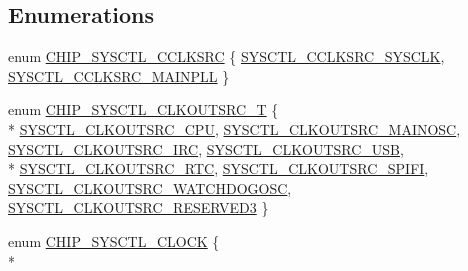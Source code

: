 \subsection*{Enumerations}
\begin{DoxyCompactItemize}
\item 
enum \hyperlink{group__CLOCK__17XX__40XX_ga1eb1eeae65911ee3e97009ae1d31d03f}{C\+H\+I\+P\+\_\+\+S\+Y\+S\+C\+T\+L\+\_\+\+C\+C\+L\+K\+S\+RC} \{ \hyperlink{group__CLOCK__17XX__40XX_gga1eb1eeae65911ee3e97009ae1d31d03faac9d326b25dd6dadba459ffdcfe0679a}{S\+Y\+S\+C\+T\+L\+\_\+\+C\+C\+L\+K\+S\+R\+C\+\_\+\+S\+Y\+S\+C\+LK}, 
\hyperlink{group__CLOCK__17XX__40XX_gga1eb1eeae65911ee3e97009ae1d31d03fac78f32749b26834cfa6eca8b321eb5c4}{S\+Y\+S\+C\+T\+L\+\_\+\+C\+C\+L\+K\+S\+R\+C\+\_\+\+M\+A\+I\+N\+P\+LL}
 \}
\item 
enum \hyperlink{group__CLOCK__17XX__40XX_ga157c4adb8f619a3aaf58dacca66a9292}{C\+H\+I\+P\+\_\+\+S\+Y\+S\+C\+T\+L\+\_\+\+C\+L\+K\+O\+U\+T\+S\+R\+C\+\_\+T} \{ \\*
\hyperlink{group__CLOCK__17XX__40XX_gga157c4adb8f619a3aaf58dacca66a9292a32bae97d5425bfbadf2a694c17ee58e3}{S\+Y\+S\+C\+T\+L\+\_\+\+C\+L\+K\+O\+U\+T\+S\+R\+C\+\_\+\+C\+PU}, 
\hyperlink{group__CLOCK__17XX__40XX_gga157c4adb8f619a3aaf58dacca66a9292a03ace6cf39b89cd24da3b4e5b6dc98ec}{S\+Y\+S\+C\+T\+L\+\_\+\+C\+L\+K\+O\+U\+T\+S\+R\+C\+\_\+\+M\+A\+I\+N\+O\+SC}, 
\hyperlink{group__CLOCK__17XX__40XX_gga157c4adb8f619a3aaf58dacca66a9292aab6063885c9c1ed6bba5e124c41bd632}{S\+Y\+S\+C\+T\+L\+\_\+\+C\+L\+K\+O\+U\+T\+S\+R\+C\+\_\+\+I\+RC}, 
\hyperlink{group__CLOCK__17XX__40XX_gga157c4adb8f619a3aaf58dacca66a9292a6a2451b3a2bf139576123b5c739c710b}{S\+Y\+S\+C\+T\+L\+\_\+\+C\+L\+K\+O\+U\+T\+S\+R\+C\+\_\+\+U\+SB}, 
\\*
\hyperlink{group__CLOCK__17XX__40XX_gga157c4adb8f619a3aaf58dacca66a9292a11372deae97553a10a9304034bb987cc}{S\+Y\+S\+C\+T\+L\+\_\+\+C\+L\+K\+O\+U\+T\+S\+R\+C\+\_\+\+R\+TC}, 
\hyperlink{group__CLOCK__17XX__40XX_gga157c4adb8f619a3aaf58dacca66a9292ae5bd27ebb2ad906e08227184842503e2}{S\+Y\+S\+C\+T\+L\+\_\+\+C\+L\+K\+O\+U\+T\+S\+R\+C\+\_\+\+S\+P\+I\+FI}, 
\hyperlink{group__CLOCK__17XX__40XX_gga157c4adb8f619a3aaf58dacca66a9292aea495475cf6b307768e012e9483b5de7}{S\+Y\+S\+C\+T\+L\+\_\+\+C\+L\+K\+O\+U\+T\+S\+R\+C\+\_\+\+W\+A\+T\+C\+H\+D\+O\+G\+O\+SC}, 
\hyperlink{group__CLOCK__17XX__40XX_gga157c4adb8f619a3aaf58dacca66a9292af57c5a24cde3e3c43fc4f95549099943}{S\+Y\+S\+C\+T\+L\+\_\+\+C\+L\+K\+O\+U\+T\+S\+R\+C\+\_\+\+R\+E\+S\+E\+R\+V\+E\+D3}
 \}
\item 
enum \hyperlink{group__CLOCK__17XX__40XX_ga16115d41e6af3d543d4c5457d8d8343c}{C\+H\+I\+P\+\_\+\+S\+Y\+S\+C\+T\+L\+\_\+\+C\+L\+O\+CK} \{ \\*

\end{DoxyCompactItemize}
